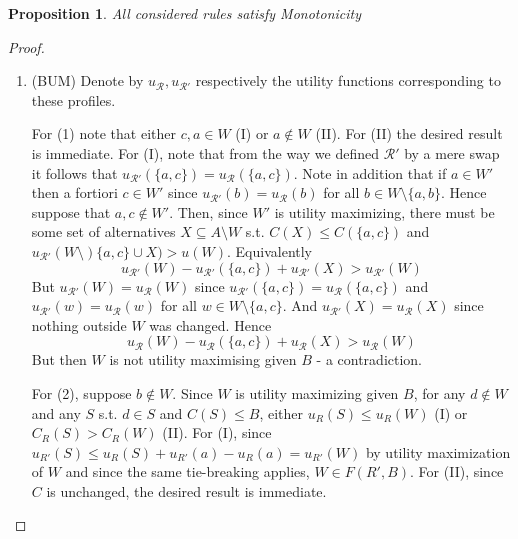 \documentclass{article}
\newtheorem{mytheorem}{Proposition}
\begin{document}
\begin{mytheorem}
All considered rules satisfy Monotonicity
\end{mytheorem}
\begin{proof}

\begin{enumerate}
\item (BUM)
Denote by $u_\mathcal{R}, u_{\mathcal{R}'}$ respectively the utility functions corresponding to these profiles.


For (1) note that either $c,a \in W$ (I) or $a\notin W$ (II). For (II) the desired result is immediate. For (I), note that from the way we defined $\mathcal{R}'$ by a mere swap it follows that $u_{\mathcal{R}'}(\{a,c\})=u_{\mathcal{R}}(\{a,c\})$. Note in addition that if $a\in W'$ then a fortiori $c\in W'$ since $u_{\mathcal{R}'}(b)=u_\mathcal{R}(b)$ for all $b\in W\setminus \{a,b\}$. Hence suppose that $a,c\notin W'$. Then, since $W'$ is utility maximizing, there must be some set of alternatives $X\subseteq A\setminus W$ s.t. $C(X)\leq C(\{a,c\})$ and $u_{\mathcal{R}'}(W\setminus)\{a,c\}\cup X)>u(W)$. Equivalently \[u_{\mathcal{R}'}(W)-u_{\mathcal{R}'}(\{a,c\})+u_{\mathcal{R}'}(X)>u_{\mathcal{R}'}(W)\] But $u_{\mathcal{R}'}(W)=u_{\mathcal{R}}(W)$ since $u_{\mathcal{R}'}(\{a,c\})=u_\mathcal{R}(\{a,c\})$ and $u_{\mathcal{R}'}(w)=u_\mathcal{R}(w)$ for all $w\in W\setminus \{a,c\}$. And $u_{\mathcal{R}'}(X)=u_\mathcal{R}(X)$ since nothing outside $W$ was changed. Hence \[u_\mathcal{R}(W)-u_\mathcal{R}(\{a,c\})+u_\mathcal{R}(X)>u_\mathcal{R}(W)\] But then $W$ is not utility maximising given $B$ - a contradiction.

For (2), suppose $b\notin W$. Since $W$ is utility maximizing given $B$, for any $d\notin W$ and any $S$ s.t. $d\in S$ and $C(S)\leq  B$, either $u_R(S)\leq u_R(W)$ (I) or $C_R(S)>C_R(W)$ (II). For (I), since $u_{R'}(S) \leq  u_{R}(S)+ u_{R'}(a)- u_{R}(a)= u_{R'}(W)$ by utility maximization of $W$ and since the same tie-breaking applies, $W\in F(R',B)$. For (II), since $C$ is unchanged, the desired result is immediate.


\end{enumerate}
\end{proof}
\end{document}
